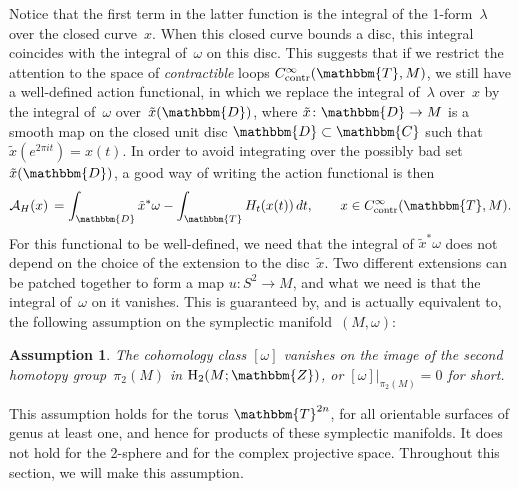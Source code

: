 \documentclass[12pt,twoside]{amsart}
\theoremstyle{plain}
\newtheorem{assumption}[theorem]{Assumption}
\numberwithin{figure}{section}
\numberwithin{equation}{section}
\def\H{\operatorname{H}}
\def\go{\omega}
\def\ca{{\mathcal A}}
\def\CC{\mathbbm{C}}
\def\DD{\mathbbm{D}}
\def\TT{\mathbbm{T}}
\def\ZZ{\mathbbm{Z}}
\begin{document}
Notice that the first term in the latter function is the integral of the 1-form~$\lambda$ over the closed curve~$x$. When this closed curve bounds a disc, this integral coincides with the integral of~$\omega$ on this disc. This suggests that if we restrict the attention to the space of {\it contractible}\/ 
loops $C^\infty_{\mathrm{contr}}(\TT,M)$, we still have a well-defined action functional, 
in which we replace the integral of~$\lambda$ over~$x$ by the integral of~$\omega$ over~$\tilde{x}(\DD)$, where $\tilde{x} \colon \DD \rightarrow M$ is a smooth map on the closed unit disc $\DD\subset \CC$ 
such that $\tilde{x}(e^{2\pi i t}) = x(t)$. 
In order to avoid integrating over the possibly bad set $\tilde x (\DD)$, a good way of writing the action functional is then
%
\begin{equation} \label{e:actionfu}
\ca_H (x) \,=\int_{\DD} \tilde{x}^* \omega - \int_{\TT} H_t(x(t)) \,dt, \qquad x \in C^\infty_{\mathrm{contr}}(\TT,M).
\end{equation}
%
For this functional to be well-defined, we need that the integral of $\tilde{x}^*\omega$ does not depend on the choice of the extension to the disc~$\tilde{x}$. Two different extensions can be patched together to form a map $u \colon S^2 \rightarrow M$, and what we need is that the integral of~$\omega$ on it vanishes. 
This is guaranteed by, and is actually equivalent to, the following assumption on 
the symplectic manifold~$(M,\omega)$:

\begin{assumption}
\label{aspherical}
The cohomology class $[\go]$ vanishes on the image
of the second homotopy group~$\pi_2(M)$ in $\H_2(M;\ZZ)$, 
or $[\go] |_{\pi_2(M)} =0$ for short.
\end{assumption}

This assumption holds for the torus $\TT^{2n}$, for all orientable surfaces of genus at least one, and hence for products of these symplectic manifolds. It does not hold for the 2-sphere and for the complex projective space. Throughout this section, we will make this assumption.
\end{document}

